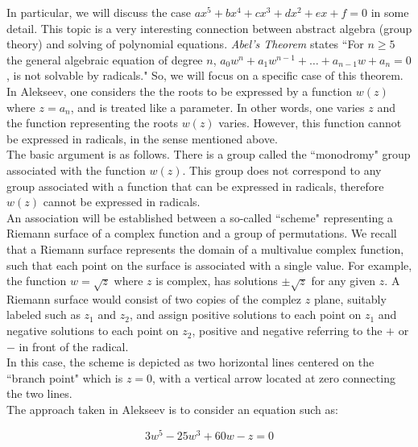 In particular, we will discuss the case $ax^{5}+bx^{4}+cx^{3}+dx^{2}+ex+f=0$ in some detail.  This topic is a very interesting connection between abstract algebra (group theory) and solving of polynomial equations.  \textit{Abel's Theorem} states ``For $n\ge5$ the general algebraic equation of degree $n$, $a_{0}w^{n}+a_{1}w^{n-1}+ \ldots + a_{n-1}w+a_{n}=0$, is not solvable by radicals."  So, we will focus on a specific case of this theorem.\\

In Alekseev, one considers the the roots to be expressed by a function $w\left(z\right)$ where $z=a_{n}$, and is treated like a parameter.  In other words, one varies $z$ and the function representing the roots $w\left(z\right)$ varies.    However, this function cannot be expressed in radicals, in the sense mentioned above.\\

The basic argument is as follows.  There is a group called the ``monodromy" group associated with the function $w\left(z\right)$.  This group does not correspond to any group associated with a function that can be expressed in radicals, therefore $w\left(z\right)$ cannot be expressed in radicals.\\

An association will be established between a so-called ``scheme" representing a Riemann surface of a complex function and a group of permutations.  We recall that a Riemann surface represents the domain of a multivalue complex function, such that each point on the surface is associated with a single value.  For example, the function $w=\sqrt{z}$ where $z$ is complex, has solutions $\pm \sqrt{z}$ for any given $z$.  A Riemann surface would consist of two copies of the complez $z$ plane, suitably labeled such as $z_{1}$ and $z_{2}$, and assign positive solutions to each point on $z_{1}$ and negative solutions to each point on $z_{2}$, positive and negative referring to the $+$ or $-$ in front of the radical.\\

In this case, the scheme is depicted as two horizontal lines centered on the ``branch point" which is $z=0$, with a vertical arrow located at zero connecting the two lines.\\

The approach taken in Alekseev is to consider an equation such as:

\begin{displaymath}
3w^{5}-25w^{3}+60w-z=0
\end{displaymath}\\ 

